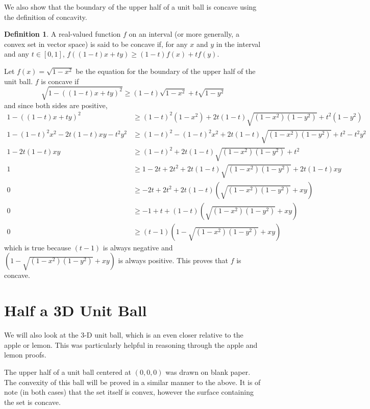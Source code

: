 \documentclass[12pt]{article}
\numberwithin{equation}{section}
\numberwithin{figure}{section}
\numberwithin{table}{section}
\theoremstyle{definition}
\newtheorem{definition}{Definition}[section]
\theoremstyle{remark}
\numberwithin{equation}{section}
\begin{document}
We also show that the boundary of the upper half of a unit ball is concave using the definition of concavity.
\begin{definition}
	A real-valued function $f$ on an interval (or more generally, a convex set in vector space) is said to be concave if, for any $x$ and $y$ in the interval and any $t \in [0, 1]$, $f((1-t)x + ty) \geq (1 - t)f(x) + tf(y)$.
\end{definition}

Let $f(x) = \sqrt{1- x^{2}}$ be the equation for the boundary of the upper half of the unit ball. $f$ is concave if 
\[
\sqrt{1 - ((1 - t)x + ty)^{2}} \geq (1- t)\sqrt{1 - x^{2}} + t\sqrt{1 - y^{2}}
\]
and since both sides are positive,
\begin{align*}
1 - ((1 - t)x + ty)^{2}
&\geq (1- t)^{2}(1 - x^{2}) + 2t(1 - t)\sqrt{(1 - x^{2})(1 - y^{2})} + t^{2}(1 - y^{2})
\\
1 - (1 - t)^{2}x^{2} - 2t(1 - t)xy - t^{2}y^{2}
&\geq (1 - t)^{2} - (1 - t)^{2}x^{2} + 2t(1 - t)\sqrt{(1 - x^{2})(1 - y^{2})} + t^{2} - t^{2}y^{2}
\\
1 - 2t(1 - t)xy
&\geq (1 - t)^{2} + 2t(1 - t)\sqrt{(1 - x^{2})(1 - y^{2})} + t^{2}
\\
1
&\geq 1 - 2t + 2t^{2} + 2t(1 - t)\sqrt{(1 - x^{2})(1 - y^{2})} + 2t(1 - t)xy
\\
0
&\geq - 2t + 2t^{2} + 2t(1 - t)(\sqrt{(1 - x^{2})(1 - y^{2})} + xy)
\\
0
&\geq -1 + t + (1 - t)(\sqrt{(1 - x^{2})(1 - y^{2})} + xy)
\\
0
&\geq (t-1)(1 - \sqrt{(1 - x^{2})(1 - y^{2})} + xy)
\end{align*}
which is true because $(t - 1)$ is always negative and $(1 - \sqrt{(1 - x^{2})(1 - y^{2})} + xy)$ is always positive. This proves that $f$ is concave.



\section{Half a 3D Unit Ball}
\label{ho3dub}

We will also look at the 3-D unit ball, which is an even closer relative to the apple or lemon. This was particularly helpful in reasoning through the apple and lemon proofs.

The upper half of a unit ball centered at $(0, 0, 0)$ was drawn on blank paper. The convexity of this ball will be proved in a similar manner to the above. It is of note (in both cases) that the set itself is convex, however the surface containing the set is concave.
\end{document}
